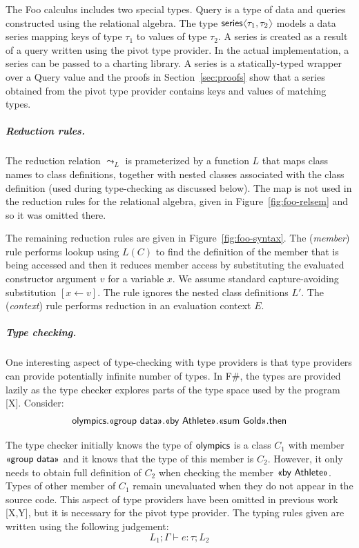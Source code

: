 \documentclass[a4paper,UKenglish]{lipics-v2016}
\theoremstyle{plain}
\theoremstyle{definition}
\newcommand{\langl}{\begin{picture}(4.5,7)
\put(1.1,2.5){\rotatebox{60}{\line(1,0){5.5}}}
\put(1.1,2.5){\rotatebox{300}{\line(1,0){5.5}}}
\end{picture}}
\newcommand{\rangl}{\begin{picture}(4.5,7)
\put(.9,2.5){\rotatebox{120}{\line(1,0){5.5}}}
\put(.9,2.5){\rotatebox{240}{\line(1,0){5.5}}}
\end{picture}}
\newcommand{\ident}[1]{\textnormal{\sffamily #1}}
\newcommand{\qident}[1]{\textnormal{\sffamily \guillemotleft #1\guillemotright}}
\begin{document}
The Foo calculus includes two special types. \ident{Query} is a type of data and queries 
constructed using the relational algebra. The type $\ident{series}\langl \tau_1, \tau_2 \rangl$ 
models a data series mapping keys of type $\tau_1$ to values of type $\tau_2$. A series is created 
as a result of a query written using the pivot type provider. In the actual implementation, a series 
can be passed to a charting library. A series is a statically-typed wrapper over a \ident{Query} 
value and the proofs in Section~\ref{sec:proofs} show that a series obtained from the pivot type 
provider contains keys and values of matching types.

\subparagraph{Reduction rules.} The reduction relation $\leadsto_L$ is prameterized by a function
$L$ that maps class names to class definitions, together with nested classes associated with the
class definition (used during type-checking as discussed below). The map is not used in the 
reduction rules for the relational algebra, given in Figure~\ref{fig:foo-relsem} and so it was 
omitted there.

The remaining reduction rules are given in Figure~\ref{fig:foo-syntax}. The (\emph{member}) rule 
performs lookup using $L(C)$ to find the definition of the member that is being accessed and then
it reduces member access by substituting the evaluated constructor argument $v$ for a variable $x$.
We assume standard capture-avoiding substitution $[x\leftarrow v]$. The rule ignores the nested 
class definitions $L'$. The (\emph{context}) rule performs reduction in an evaluation context $E$.

\subparagraph{Type checking.} One interesting aspect of type-checking with type providers is that
type providers can provide potentially infinite number of types. In F\#, the types are provided 
lazily as the type checker explores parts of the type space used by the program [X]. Consider:
%
\begin{equation*}
\ident{olympics}.\qident{group data}.\qident{by Athlete}.\qident{sum Gold}.\ident{then}
\end{equation*}

\noindent
The type checker initially knows the type of $\ident{olympics}$ is a class $C_1$ with member 
$\qident{group data}$ and it knows that the type of this member is $C_2$. However, it only needs to 
obtain full definition of $C_2$ when checking the member $\qident{by Athlete}$. Types of other 
member of $C_1$ remain unevaluated when they do not appear in the source code. This aspect of type
providers have been omitted in previous work [X,Y], but it is necessary for the pivot type provider.
The typing rules given are written using the following judgement:
%
\begin{equation*}
L_1; \Gamma \vdash e : \tau; L_2
\end{equation*}
\end{document}
